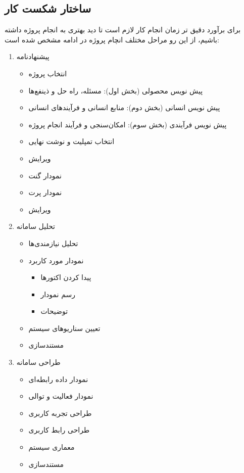 \subsection{ساختار شکست کار
}
برای برآورد دقیق تر زمان انجام کار لازم است تا دید بهتری به انجام پروژه داشته باشیم، از این رو مراحل مختلف انچام پروژه در ادامه مشخص شده است:
\begin{enumerate}
	\item 
	پیشنهادنامه
	\begin{itemize}
		\item 
		انتخاب پروژه
		\item
		پیش نویس محصولی (بخش اول): مسئله، راه حل  و ذینفع‌ها
		\item
		پیش نویس انسانی (بخش دوم): منابع انسانی و فرآیند‌های انسانی
		\item
		پیش نویس فرآیندی (بخش سوم): امکان‌سنجی و فرآیند انجام پروژه
		\item
		انتخاب تمپلیت و نوشت نهایی
		\item
		ویرایش
		\item
		نمودار گنت
		\item
		نمودار پرت
		\item
		ویرایش
	\end{itemize}
	\item 
	تحلیل سامانه
	\begin{itemize}
		\item 
		تحلیل نیازمندی‌ها
		\item
		نمودار مورد کاربرد
		\begin{itemize}
			\item 
			پیدا کردن اکتورها
			\item 
			رسم نمودار
			\item 
			توضیحات
		\end{itemize}
		\item
		تعیین سناریوهای سیستم
		\item
		مستندسازی
	\end{itemize}
	\item 
	طراحی سامانه
	\begin{itemize}
		\item 
		نمودار داده رابطه‌ای
		\item 
		نمودار فعالیت و توالی
		\item
		طراحی تجربه کاربری
		\item
		 طراحی رابط کاربری
		 \item 
		معماری سیستم
		\item 
		مستندسازی
		

\end{itemize}
\end{enumerate}
